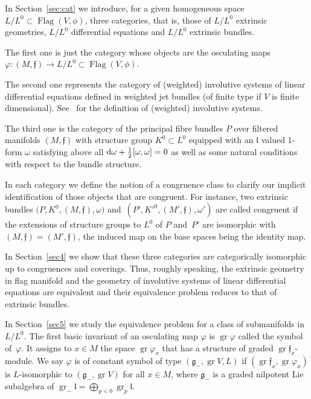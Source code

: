 \documentclass[pdftex]{sigma}%
\newcommand{\f}{\mathfrak f}
\newcommand{\g}{\mathfrak g}
\newcommand{\lf}{\mathfrak l}
\newcommand{\Flag}{\operatorname{Flag}}
\newcommand{\gr}{\operatorname{gr}}
\numberwithin{equation}{section}
\begin{document}
In Section~\ref{sec:cat} we introduce, for a given homogeneous space $L/L^0 \subset \Flag(V, \phi) $, three categories, that is, those of $L/L^0$ extrinsic geometries, $L/L^0$ differential equations and $L/L^0$ extrinsic bundles.

The first one is just the category whose objects are the osculating maps $\varphi\colon (M, \mathfrak f) \to L/L^0 \subset \Flag(V, \phi )$.

The second one represents the category of (weighted) involutive systems of linear differential equations defined in weighted jet bundles (of finite type if $V$ is finite dimensional). See~\cite{Mor2002} for the definition of (weighted) involutive systems.

The third one is the category of the principal fibre bundles $P$ over filtered manifolds $(M, \f )$ with structure group $K^0 \subset L^0$ equipped with an $\mathfrak l$ valued 1-form $\omega$ satisfying above all ${\rm d}\omega + \frac 12 [\omega, \omega] = 0$ as well as some natural conditions with respect to the bundle structure.

In each category we define the notion of a congruence class to clarify our implicit identification of those objects that are congruent.
For instance, two extrinsic bundles $\big(P, K^0, (M, \f), \omega\big)$ and~$(P', K'^0, (M', \f), \omega ')$ are called congruent if the extensions of structure groups to $L^0$ of $P$ and~$P'$ are isomorphic with $(M, \f)=(M', \f)$, the induced map on the base spaces being the identity map.

In Section~\ref{sec4} we show that these three categories are categorically isomorphic up to congruences and coverings.
Thus, roughly speaking, the extrinsic geometry in flag manifold and the geometry of involutive systems of linear differential equations are equivalent and their equivalence problem reduces to that of extrinsic bundles.

In Section~\ref{sec5} we study the equivalence problem for a class of submanifolds in $L/L^0$. The first basic invariant of an osculating map $\varphi$ is $\gr\varphi$ called the symbol of~$\varphi$. It assigns to $x \in M$ the space $\gr\varphi_x $ that has a structure of graded $\gr\f_x$-module. We say $\varphi$ is of constant symbol of type $(\g_-, \gr V, L)$ if $(\gr\f_x, \gr\varphi _x)$ is $L$-isomorphic to $ (\g_-, \gr V)$ for all $x \in M$, where $\g_-$ is a graded nilpotent Lie subalgebra of $\gr_- \lf = \bigoplus_{p <0} \gr_p \lf$.
\end{document}

